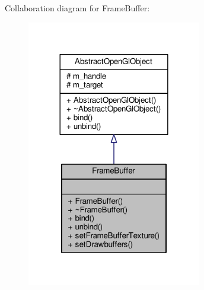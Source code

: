 Collaboration diagram for Frame\-Buffer\-:\nopagebreak
\begin{figure}[H]
\begin{center}
\leavevmode
\includegraphics[width=216pt]{class_frame_buffer__coll__graph}
\end{center}
\end{figure}
